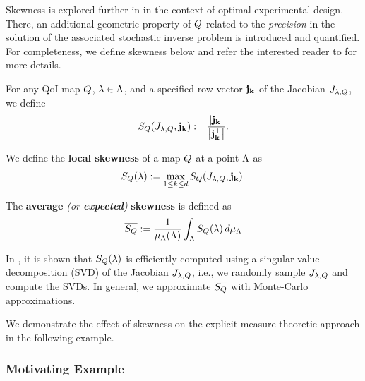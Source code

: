 Skewness is explored further in \cite{Walsh} in the context of optimal experimental design.
There, an additional geometric property of $Q$ related to the \emph{precision} in the solution of the associated stochastic inverse problem is introduced and quantified.
For completeness, we define skewness below and refer the interested reader to \cite{BGE+15, BPW17, Walsh} for more details.

\begin{defn}
For any QoI map $Q$, $\lambda \in {\Lambda}$, and a specified row vector $\bf{j}_k$ of the Jacobian $J_{\lambda, Q}$, we define
\begin{equation}
S_Q(J_{\lambda,Q}, \bf{j}_k) := \frac{\left\vert\bf{j}_k\right\vert }{\left\vert\bf{j}_k^\perp\right\vert}.
\label{eq:skewness}
\end{equation}

We define the \textbf{local skewness} of a map $Q$ at a point ${\Lambda}$ as
\begin{equation}
S_Q(\lambda) := \max_{1\leq k \leq d} S_Q(J_{\lambda,Q}, \bf{j}_k).
\label{eq:localskewness}
\end{equation}
\end{defn}

\begin{defn}
The \textbf{average} \emph{(or \textbf{expected})} \textbf{skewness} is defined as
\begin{equation}
\overline{S_Q} := \frac{1}{\mu_{{\Lambda}}({\Lambda})} \int_{\Lambda} S_Q (\lambda) \, d\mu_{{\Lambda}}
\label{eq:avgskew}
\end{equation}
\end{defn}

In \cite{BPW17}, it is shown that $S_Q(\lambda)$ is efficiently computed using a singular value decomposition (SVD) of the Jacobian $J_{\lambda,Q}$, i.e., we randomly sample $J_{\lambda,Q}$ and compute the SVDs.
In general, we approximate $\overline{S_Q}$ with Monte-Carlo approximations.

We demonstrate the effect of skewness on the explicit measure theoretic approach in the following example.

\subsubsection{Motivating Example}

